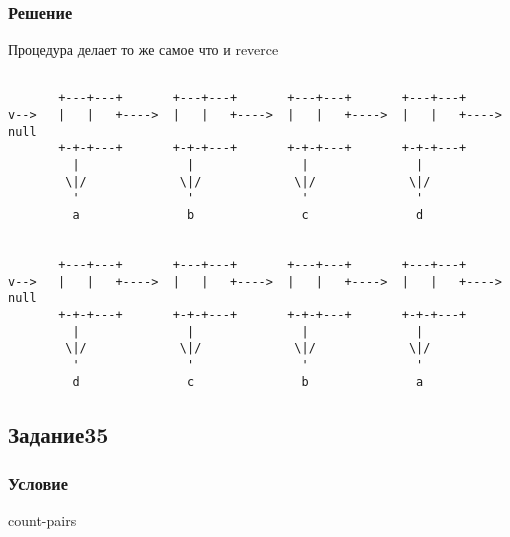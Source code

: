 \documentclass[10pt,a4paper]{article}
\begin{document}
\subsubsection*{Решение}
Процедура делает то же самое что и reverce

\begin{lstlisting}

       +---+---+       +---+---+       +---+---+       +---+---+
v-->   |   |   +---->  |   |   +---->  |   |   +---->  |   |   +---->  null
       +-+-+---+       +-+-+---+       +-+-+---+       +-+-+---+
         |               |               |               |
        \|/             \|/             \|/             \|/
         '               '               '               '
         a               b               c               d


       +---+---+       +---+---+       +---+---+       +---+---+
v-->   |   |   +---->  |   |   +---->  |   |   +---->  |   |   +----> null
       +-+-+---+       +-+-+---+       +-+-+---+       +-+-+---+
         |               |               |               |
        \|/             \|/             \|/             \|/
         '               '               '               '
         d               c               b               a

\end{lstlisting}

\subsection*{Задание35}
\subsubsection*{Условие}
count-pairs
\end{document}
